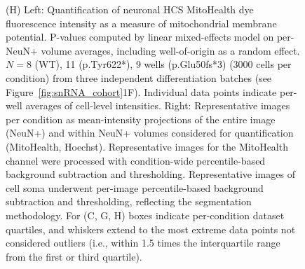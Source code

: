 \begin{figure}[ht]
{        (H) Left: Quantification of neuronal HCS MitoHealth dye fluorescence intensity as a measure of mitochondrial membrane potential. P-values computed by linear mixed-effects model on per-NeuN+ volume averages, including well-of-origin as a random effect. $N=8$ (WT), 11 (p.Tyr622*), 9 wells (p.Glu50fs*3) (3000 cells per condition) from three independent differentiation batches (see Figure~\ref{fig:snRNA_cohort}1F). Individual data points indicate per-well averages of cell-level intensities. Right: Representative images per condition as mean-intensity projections of the entire image (NeuN+) and within NeuN+ volumes considered for quantification (MitoHealth, Hoechst). Representative images for the MitoHealth channel were processed with condition-wide percentile-based background subtraction and thresholding. Representative images of cell soma underwent per-image percentile-based background subtraction and thresholding, reflecting the segmentation methodology. For (C, G, H) boxes indicate per-condition dataset quartiles, and whiskers extend to the most extreme data points not considered outliers (i.e., within 1.5 times the interquartile range from the first or third quartile). 
    }
    \label{fig:main_mitochondrial}
\end{figure}

